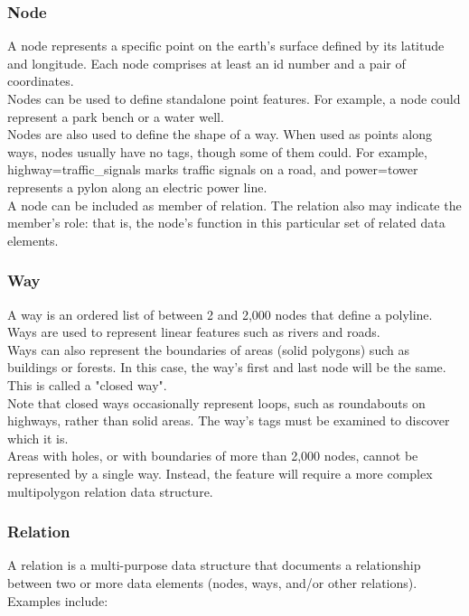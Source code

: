 \subsubsection{Node}
A node represents a specific point on the earth's surface defined by its latitude and longitude. Each node comprises at least an id number and a pair of coordinates.\\
Nodes can be used to define standalone point features. For example, a node could represent a park bench or a water well.\\
Nodes are also used to define the shape of a way. When used as points along ways, nodes usually have no tags, though some of them could. For example, highway=traffic_signals marks traffic signals on a road, and power=tower represents a pylon along an electric power line.\\
A node can be included as member of relation. The relation also may indicate the member's role: that is, the node's function in this particular set of related data elements. \cite{OSMElements}
\subsubsection{Way}
A way is an ordered list of between 2 and 2,000 nodes that define a polyline. Ways are used to represent linear features such as rivers and roads.\\
Ways can also represent the boundaries of areas (solid polygons) such as buildings or forests. In this case, the way's first and last node will be the same. This is called a "closed way".\\
Note that closed ways occasionally represent loops, such as roundabouts on highways, rather than solid areas. The way's tags must be examined to discover which it is.\\
Areas with holes, or with boundaries of more than 2,000 nodes, cannot be represented by a single way. Instead, the feature will require a more complex multipolygon relation data structure. \cite{OSMElements}
\subsubsection{Relation}
A relation is a multi-purpose data structure that documents a relationship between two or more data elements (nodes, ways, and/or other relations). Examples include:

